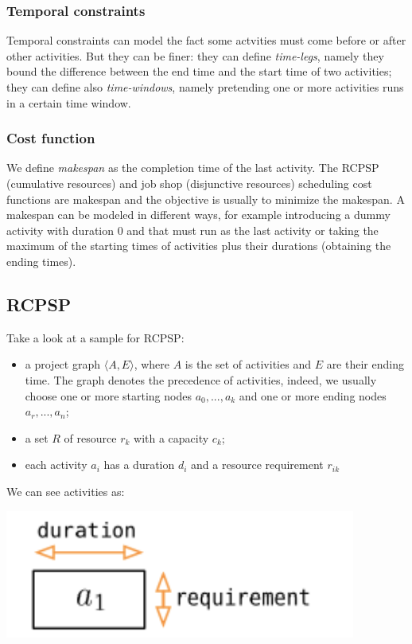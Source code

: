 \documentclass[10pt,a4paper]{article}
\begin{document}
\subsubsection{Temporal constraints}
Temporal constraints can model the fact some actvities must come before or after
other activities. But they can be finer: they can define \textit{time-legs},
namely they bound the difference between the end time and the start time of two
activities; they can define also \textit{time-windows}, namely pretending one or
more activities runs in a certain time window.

\subsubsection{Cost function}
We define \textit{makespan} as the completion time of the last activity.
The RCPSP (cumulative resources) and job shop (disjunctive resources) scheduling
cost functions are makespan and the objective is usually to minimize the
makespan. A makespan can be modeled in different ways, for example introducing
a dummy activity with duration 0 and that must run as the last activity or
taking the maximum of the starting times of activities plus their durations
(obtaining the ending times).

\hypertarget{rcpsp}{\subsection{RCPSP}}
Take a look at a sample for RCPSP:
\begin{itemize}
    \item a project graph $\langle A, E \rangle$, where $A$ is the set of
    activities and $E$ are their ending time. The graph denotes the precedence
    of activities, indeed, we usually choose one or more starting nodes $a_0,
    ..., a_k$ and one or more ending nodes $a_r, ..., a_n$;
    \item a set $R$ of resource $r_k$ with a capacity $c_k$;
    \item each activity $a_i$ has a duration $d_i$ and a resource requirement
    $r_{ik}$
\end{itemize}
We can see activities as:

\includegraphics[scale=0.35]{activity.png}
\end{document}
